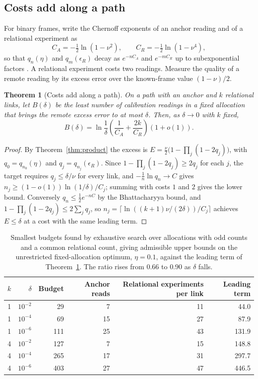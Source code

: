 \documentclass[11pt,a4paper]{article}
\newtheorem{theorem}[definition]{Theorem}
\begin{document}
\subsection{Costs add along a path}

For binary frames, write the Chernoff exponents of an anchor reading and of a relational experiment as
\[
 C_A=-\tfrac12\ln(1-\nu^2),\qquad C_R=-\tfrac12\ln(1-\nu^4),
\]
so that $q_n(\eta)$ and $q_m(\epsilon_R)$ decay as $e^{-nC_A}$ and $e^{-mC_R}$ up to subexponential factors \cite{CoverThomas2006}. A relational experiment costs two readings. Measure the quality of a remote reading by its excess error over the known-frame value $(1-\nu)/2$.

\begin{theorem}[Costs add along a path]\label{thm:budget}
On a path with an anchor and $k$ relational links, let $B(\delta)$ be the least number of calibration readings in a fixed allocation that brings the remote excess error to at most $\delta$. Then, as $\delta\to0$ with $k$ fixed,
\[
 B(\delta)=\ln\frac1\delta\left(\frac1{C_A}+\frac{2k}{C_R}\right)(1+o(1)).
\]
\end{theorem}
\begin{proof}
By Theorem~\ref{thm:product} the excess is $E=\frac\nu2\bigl(1-\prod_j(1-2q_j)\bigr)$, with $q_0=q_{n_0}(\eta)$ and $q_j=q_{n_j}(\epsilon_R)$. Since $1-\prod_j(1-2q_j)\ge2q_j$ for each $j$, the target requires $q_j\le\delta/\nu$ for every link, and $-\frac1n\ln q_n\to C$ gives $n_j\ge(1-o(1))\ln(1/\delta)/C_j$; summing with costs $1$ and $2$ gives the lower bound. Conversely $q_n\le\frac12e^{-nC}$ by the Bhattacharyya bound, and $1-\prod_j(1-2q_j)\le2\sum_jq_j$, so $n_j=\lceil\ln((k+1)\nu/(2\delta))/C_j\rceil$ achieves $E\le\delta$ at a cost with the same leading term.
\end{proof}

\begin{table}[ht]
\centering
\begin{tabular}{rrrrrr}
\toprule
$k$ & $\delta$ & Budget & Anchor reads & Relational experiments per link & Leading term\\
\midrule
1 & $10^{-2}$ & 29 & 7 & 11 & 44.0\\
1 & $10^{-4}$ & 69 & 15 & 27 & 87.9\\
1 & $10^{-6}$ & 111 & 25 & 43 & 131.9\\
4 & $10^{-2}$ & 127 & 7 & 15 & 148.8\\
4 & $10^{-4}$ & 265 & 17 & 31 & 297.7\\
4 & $10^{-6}$ & 403 & 27 & 47 & 446.5\\
\bottomrule
\end{tabular}
\caption{Smallest budgets found by exhaustive search over allocations with odd counts and a common relational count, giving admissible upper bounds on the unrestricted fixed-allocation optimum, $\eta=0.1$, against the leading term of Theorem~\ref{thm:budget}. The ratio rises from $0.66$ to $0.90$ as $\delta$ falls.}\label{tab:budget}
\end{table}
\end{document}
